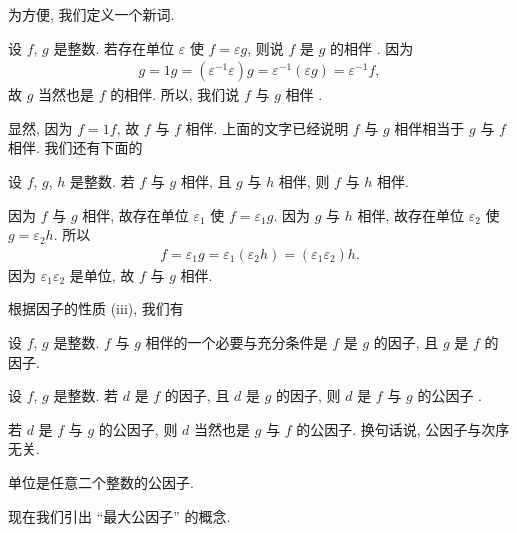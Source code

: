 为方便, 我们定义一个新词.

\begin{definition}
    设 $f$, $g$ 是整数. 若存在单位 $\varepsilon$ 使 $f = \varepsilon g$, 则说 $f$ 是 $g$ 的相伴 . 因为
    \begin{align*}
        g = 1g = (\varepsilon^{-1} \varepsilon) g = \varepsilon^{-1} (\varepsilon g) = \varepsilon^{-1} f,
    \end{align*}
    故 $g$ 当然也是 $f$ 的相伴. 所以, 我们说 $f$ 与 $g$ 相伴 .
\end{definition}

显然, 因为 $f = 1f$, 故 $f$ 与 $f$ 相伴. 上面的文字已经说明 $f$ 与 $g$ 相伴相当于 $g$ 与 $f$ 相伴. 我们还有下面的
\begin{proposition}
    设 $f$, $g$, $h$ 是整数. 若 $f$ 与 $g$ 相伴, 且 $g$ 与 $h$ 相伴, 则 $f$ 与 $h$ 相伴.
\end{proposition}

\begin{pf}
    因为 $f$ 与 $g$ 相伴, 故存在单位 $\varepsilon_1$ 使 $f = \varepsilon_1 g$. 因为 $g$ 与 $h$ 相伴, 故存在单位 $\varepsilon_2$ 使 $g = \varepsilon_2 h$. 所以
    \begin{align*}
        f = \varepsilon_1 g = \varepsilon_1 (\varepsilon_2 h) = (\varepsilon_1 \varepsilon_2) h.
    \end{align*}
    因为 $\varepsilon_1 \varepsilon_2$ 是单位, 故 $f$ 与 $g$ 相伴.
\end{pf}

根据因子的性质 (iii), 我们有
\begin{proposition}
    设 $f$, $g$ 是整数. $f$ 与 $g$ 相伴的一个必要与充分条件是 $f$ 是 $g$ 的因子, 且 $g$ 是 $f$ 的因子.
\end{proposition}

\begin{definition}
    设 $f$, $g$ 是整数. 若 $d$ 是 $f$ 的因子, 且 $d$ 是 $g$ 的因子, 则 $d$ 是 $f$ 与 $g$ 的公因子 .
\end{definition}

\begin{remark}
    若 $d$ 是 $f$ 与 $g$ 的公因子, 则 $d$ 当然也是 $g$ 与 $f$ 的公因子. 换句话说, 公因子与次序无关.
\end{remark}

\begin{example}
    单位是任意二个整数的公因子.
\end{example}

现在我们引出 ``最大公因子'' 的概念.

